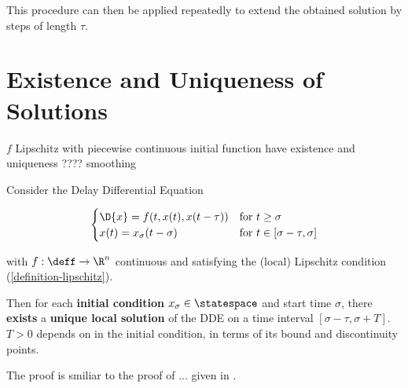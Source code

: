 This procedure can then be applied repeatedly to extend the obtained solution by steps of length $\tau$.

\section{Existence and Uniqueness of Solutions} \label{existence-and-uniqueness-of-solutions}

$f$ Lipschitz with piecewise continuous initial function have existence and uniqueness ???? smoothing

\begin{theorem}
    \label{theorem-solution-existence}
    Consider the Delay Differential Equation



    \begin{equation}
        \begin{cases}
            \D{x} = f(t,x(t),x(t-\tau)) & \text{for } t\geq\sigma\\
            x(t) = x_\sigma(t-\sigma)     & \text{for } t\in [\sigma-\tau,\sigma]
        \end{cases}
    \end{equation}

    with $f:\deff\rightarrow\R^n$ continuous and satisfying the (local) Lipschitz condition (\ref{definition-lipschitz}).

    Then for each \textbf{initial condition} $x_\sigma\in\statespace$ and start time $\sigma$, there \textbf{exists} a \textbf{unique local solution} of the DDE on a time interval $[\sigma-\tau, \sigma+T]$. $T>0$ depends on in the initial condition, in terms of its bound and discontinuity points.
\end{theorem}
The proof is smiliar to the proof of ... given in \cite{smith2010introDDE}.
